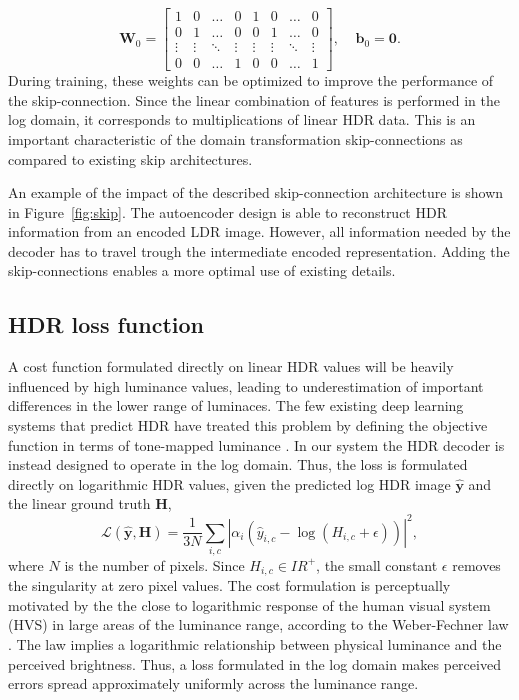 \documentclass[acmtog]{acmart}
\newcommand{\figref}[1]{Figure~\ref{fig:#1}}
\newcommand{\Real}{\ensuremath{I\!R}}
\newcommand{\vect}[1]{\boldsymbol{#1}}
\newcommand{\loss}{\mathcal{L}}
\newcommand{\hdrp}{H}
\newcommand{\yp}{\hat{y}}
\newcommand{\hdr}{\vect{\hdrp}}
\newcommand{\y}{\vect{\yp}}
\newcommand{\msk}{\alpha}
\begin{document}
\begin{equation}
\vect{W}_0 =  
\begin{bmatrix}
1 & 0 & \dots & 0 & 1 & 0 & \dots & 0 \\ 
0 & 1 &  \dots & 0 & 0 & 1 &  \dots & 0 \\ 
\vdots & \vdots & \ddots & \vdots & \vdots & \vdots & \ddots & \vdots \\
0 & 0 &  \dots & 1 & 0 & 0 &  \dots & 1
\end{bmatrix}, \;\;\;\; \vect{b}_0 = \vect{0}.
\label{eqn:skip_weights}
\end{equation}
During training, these weights can be optimized to improve the performance of the skip-connection. 
Since the linear combination of features is performed in the log domain, it corresponds to multiplications of linear HDR data. This is an important characteristic of the domain transformation skip-connections as compared to existing skip architectures.

An example of the impact of the described skip-connection architecture is shown in \figref{skip}. The autoencoder design is able to reconstruct HDR information from an encoded LDR image. However, all information needed by the decoder has to travel trough the intermediate encoded representation. Adding the skip-connections enables a more optimal use of existing details.

\subsection{HDR loss function}\label{sec:loss}
A cost function formulated directly on linear HDR values will be heavily influenced by high luminance values, leading to underestimation of important differences in the lower range of luminaces. The few existing deep learning systems that predict HDR have treated this problem by defining the objective function in terms of tone-mapped luminance \cite{Zhang2017,Kalantari2017}. In our system the HDR decoder is instead designed to operate in the log domain. Thus, the loss is formulated directly on logarithmic HDR values, given the predicted log HDR image $\y$ and the linear ground truth $\hdr$,
\begin{equation}
\loss(\y,\hdr) = \frac{1}{3N}\sum_{i,c}\left| \msk_i \left(\yp_{i,c} - \log \left(\hdrp_{i,c} + \epsilon\right) \right) \right|^2,
\label{eqn:mse_loss}
\end{equation}
where $N$ is the number of pixels.
Since $\hdrp_{i,c} \in \Real^+$, the small constant $\epsilon$ removes the singularity at zero pixel values. The cost formulation is perceptually motivated by the the close to logarithmic response of the human visual system (HVS) in large areas of the luminance range, according to the Weber-Fechner law \cite{Fechner1965}. The law implies a logarithmic relationship between physical luminance and the perceived brightness. Thus, a loss formulated in the log domain makes perceived errors spread approximately uniformly across the luminance range.
\end{document}
